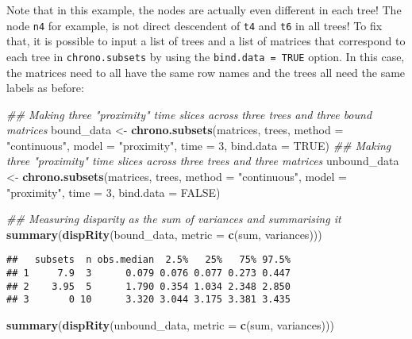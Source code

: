 \documentclass[
]{book}
\newenvironment{Shaded}{\begin{snugshade}}{\end{snugshade}}
\newcommand{\CommentTok}[1]{\textcolor[rgb]{0.56,0.35,0.01}{\textit{#1}}}
\newcommand{\DataTypeTok}[1]{\textcolor[rgb]{0.13,0.29,0.53}{#1}}
\newcommand{\DecValTok}[1]{\textcolor[rgb]{0.00,0.00,0.81}{#1}}
\newcommand{\KeywordTok}[1]{\textcolor[rgb]{0.13,0.29,0.53}{\textbf{#1}}}
\newcommand{\NormalTok}[1]{#1}
\newcommand{\OtherTok}[1]{\textcolor[rgb]{0.56,0.35,0.01}{#1}}
\newcommand{\StringTok}[1]{\textcolor[rgb]{0.31,0.60,0.02}{#1}}
\begin{document}
Note that in this example, the nodes are actually even different in each tree! The node \texttt{n4} for example, is not direct descendent of \texttt{t4} and \texttt{t6} in all trees!
To fix that, it is possible to input a list of trees and a list of matrices that correspond to each tree in \texttt{chrono.subsets} by using the \texttt{bind.data\ =\ TRUE} option.
In this case, the matrices need to all have the same row names and the trees all need the same labels as before:

\begin{Shaded}
\begin{Highlighting}[]
\CommentTok{\#\# Making three "proximity" time slices across three trees and three bound matrices}
\NormalTok{bound\_data \textless{}{-}}\StringTok{ }\KeywordTok{chrono.subsets}\NormalTok{(matrices, trees,}
                             \DataTypeTok{method =} \StringTok{"continuous"}\NormalTok{,}
                             \DataTypeTok{model =} \StringTok{"proximity"}\NormalTok{,}
                             \DataTypeTok{time =} \DecValTok{3}\NormalTok{,}
                             \DataTypeTok{bind.data =} \OtherTok{TRUE}\NormalTok{)}
\CommentTok{\#\# Making three "proximity" time slices across three trees and three matrices}
\NormalTok{unbound\_data \textless{}{-}}\StringTok{ }\KeywordTok{chrono.subsets}\NormalTok{(matrices, trees,}
                               \DataTypeTok{method =} \StringTok{"continuous"}\NormalTok{,}
                               \DataTypeTok{model =} \StringTok{"proximity"}\NormalTok{,}
                               \DataTypeTok{time =} \DecValTok{3}\NormalTok{,}
                               \DataTypeTok{bind.data =} \OtherTok{FALSE}\NormalTok{)}

\CommentTok{\#\# Measuring disparity as the sum of variances and summarising it}
\KeywordTok{summary}\NormalTok{(}\KeywordTok{dispRity}\NormalTok{(bound\_data, }\DataTypeTok{metric =} \KeywordTok{c}\NormalTok{(sum, variances)))}
\end{Highlighting}
\end{Shaded}

\begin{verbatim}
##   subsets  n obs.median  2.5%   25%   75% 97.5%
## 1     7.9  3      0.079 0.076 0.077 0.273 0.447
## 2    3.95  5      1.790 0.354 1.034 2.348 2.850
## 3       0 10      3.320 3.044 3.175 3.381 3.435
\end{verbatim}

\begin{Shaded}
\begin{Highlighting}[]
\KeywordTok{summary}\NormalTok{(}\KeywordTok{dispRity}\NormalTok{(unbound\_data, }\DataTypeTok{metric =} \KeywordTok{c}\NormalTok{(sum, variances)))}
\end{Highlighting}
\end{Shaded}
\end{document}
